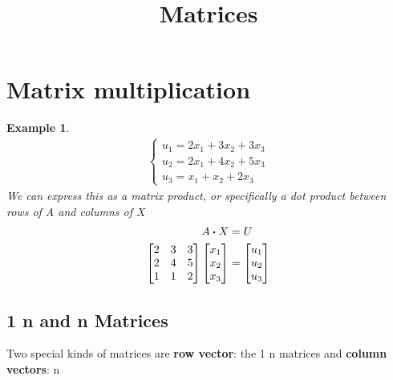 \documentclass{article}
\begin{document}
    \title{Matrices}
    \maketitle

    \newtheorem{theorem}{Theorem}
    \newtheorem{definition}{Definition}
    \newtheorem{example}{Example}
    \newtheorem{problem}{Problem}


    \section{Matrix multiplication}

    \begin{example}
        \begin{align*}
            \begin{cases}
                u_1 =2x_1 +3x_2 + 3x_3 \\
                u_2 = 2x_1 + 4x_2 + 5x_3 \\
                u_3 = x_1 + x_2 + 2x_3
            \end{cases}
        \end{align*}
        We can express this as a matrix product, or specifically a dot product between rows of A and columns of X
        \begin{align*}
            A\vdot X & =U\\
            \bmqty{2 & 3 & 3\\
            2 & 4 & 5\\
            1 & 1 & 2}
            \bmqty{x_1 \\ x_2 \\ x_3 }
            & =\bmqty{u_1 \\ u_2 \\ u_3}
        \end{align*}
    \end{example}

    \subsection{1 \cross n and n  Matrices}
    Two special kinds of matrices are \textbf{row vector}: the 1 \cross n matrices and \textbf{column vectors}: n 
\end{document}
